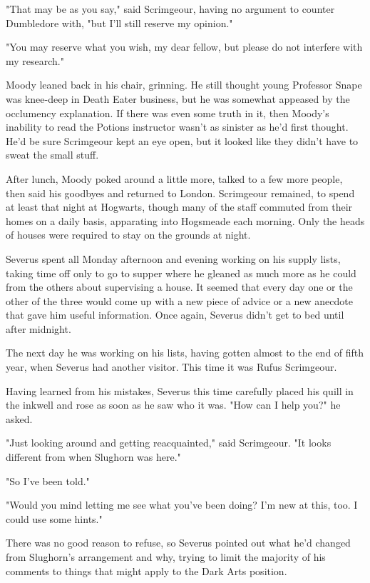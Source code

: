 \documentclass[a4paper,11pt]{article}
\begin{document}
"That may be as you say," said Scrimgeour, having no argument to counter Dumbledore with, "but I'll still reserve my opinion."

"You may reserve what you wish, my dear fellow, but please do not interfere with my research."

Moody leaned back in his chair, grinning. He still thought young Professor Snape was knee-deep in Death Eater business, but he was somewhat appeased by the occlumency explanation. If there was even some truth in it, then Moody's inability to read the Potions instructor wasn't as sinister as he'd first thought. He'd be sure Scrimgeour kept an eye open, but it looked like they didn't have to sweat the small stuff.

After lunch, Moody poked around a little more, talked to a few more people, then said his goodbyes and returned to London. Scrimgeour remained, to spend at least that night at Hogwarts, though many of the staff commuted from their homes on a daily basis, apparating into Hogsmeade each morning. Only the heads of houses were required to stay on the grounds at night.

Severus spent all Monday afternoon and evening working on his supply lists, taking time off only to go to supper where he gleaned as much more as he could from the others about supervising a house. It seemed that every day one or the other of the three would come up with a new piece of advice or a new anecdote that gave him useful information. Once again, Severus didn't get to bed until after midnight.

The next day he was working on his lists, having gotten almost to the end of fifth year, when Severus had another visitor. This time it was Rufus Scrimgeour.

Having learned from his mistakes, Severus this time carefully placed his quill in the inkwell and rose as soon as he saw who it was. "How can I help you?" he asked.

"Just looking around and getting reacquainted," said Scrimgeour. "It looks different from when Slughorn was here."

"So I've been told."

"Would you mind letting me see what you've been doing? I'm new at this, too. I could use some hints."

There was no good reason to refuse, so Severus pointed out what he'd changed from Slughorn's arrangement and why, trying to limit the majority of his comments to things that might apply to the Dark Arts position.
\end{document}
